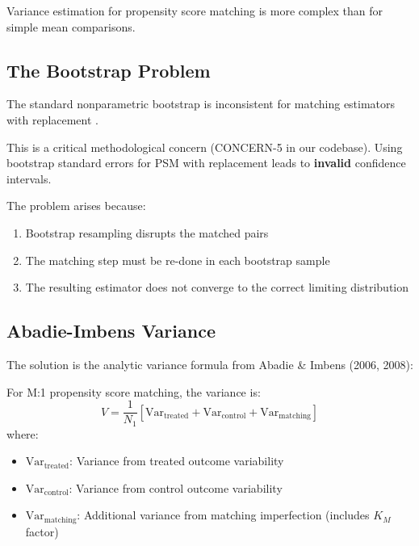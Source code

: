 Variance estimation for propensity score matching is more complex than for simple mean comparisons.

\subsection{The Bootstrap Problem}

\begin{theorem}
\label{thm:bootstrap_fails}
The standard nonparametric bootstrap is inconsistent for matching estimators with replacement \cite{abadie2016matching}.
\end{theorem}

\begin{insight}
This is a critical methodological concern (CONCERN-5 in our codebase). Using bootstrap standard errors for PSM with replacement leads to \textbf{invalid} confidence intervals.
\end{insight}

The problem arises because:
\begin{enumerate}
    \item Bootstrap resampling disrupts the matched pairs
    \item The matching step must be re-done in each bootstrap sample
    \item The resulting estimator does not converge to the correct limiting distribution
\end{enumerate}

\subsection{Abadie-Imbens Variance}

The solution is the analytic variance formula from Abadie \& Imbens (2006, 2008):

\begin{theorem}
\label{thm:abadie_imbens}
For M:1 propensity score matching, the variance is:
\begin{equation}
V = \frac{1}{N_1} \left[ \text{Var}_{\text{treated}} + \text{Var}_{\text{control}} + \text{Var}_{\text{matching}} \right]
\label{eq:ai_variance}
\end{equation}
where:
\begin{itemize}
    \item $\text{Var}_{\text{treated}}$: Variance from treated outcome variability
    \item $\text{Var}_{\text{control}}$: Variance from control outcome variability
    \item $\text{Var}_{\text{matching}}$: Additional variance from matching imperfection (includes $K_M$ factor)
\end{itemize}
\end{theorem}

